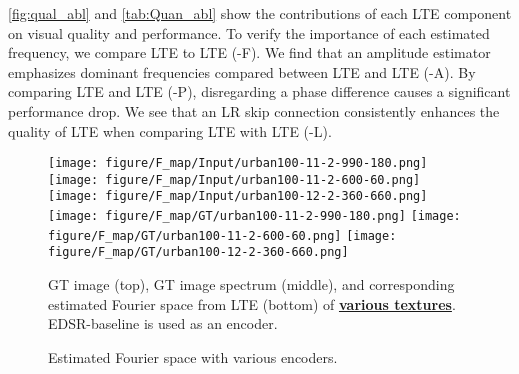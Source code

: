 \documentclass[10pt,twocolumn,letterpaper]{article}
\begin{document}
\cref{fig:qual_abl} and \cref{tab:Quan_abl} show the contributions of each LTE component on visual quality and performance. To verify the importance of each estimated frequency, we compare LTE to LTE (-F). We find that an amplitude estimator emphasizes dominant frequencies compared between LTE and LTE (-A). By comparing LTE and LTE (-P), disregarding a phase difference causes a significant performance drop. We see that an LR skip connection consistently enhances the quality of LTE when comparing LTE with LTE (-L).

\begin{figure}[t]
\footnotesize
\centering
\texttt{[image: figure/F\_map/Input/urban100-11-2-990-180.png]}
\texttt{[image: figure/F\_map/Input/urban100-11-2-600-60.png]}
\texttt{[image: figure/F\_map/Input/urban100-12-2-360-660.png]}
\texttt{[image: figure/F\_map/GT/urban100-11-2-990-180.png]}
\texttt{[image: figure/F\_map/GT/urban100-11-2-600-60.png]}
\texttt{[image: figure/F\_map/GT/urban100-12-2-360-660.png]}


\vspace*{-6pt}
\caption{GT image (top), GT image spectrum (middle), and corresponding estimated Fourier space from LTE (bottom) of \underline{\textbf{various textures}}. EDSR-baseline \cite{Lim_2017_CVPR_Workshops} is used as an encoder.}
\label{fig:four_vis}
\end{figure}

\begin{figure}[t]
\vspace{-6pt}
\footnotesize
\centering
{}

\vspace*{-6pt}
\caption{Estimated Fourier space with various encoders.}
\label{fig:four:enc}
\vspace{-15pt}
\end{figure}
\end{document}
